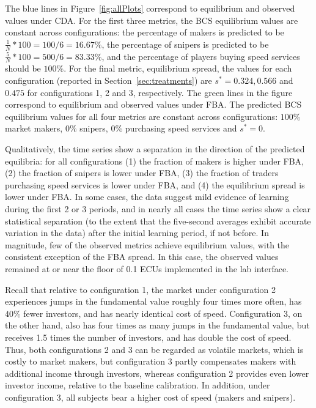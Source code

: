 \documentclass[12pt]{article}
\begin{document}
The blue lines in Figure~\ref{fig:allPlots} correspond to equilibrium and observed values under CDA. For the first three metrics, the BCS equilibrium values are constant across configurations: the percentage of makers is predicted to be $\frac{1}{N}*100 = 100/6 = 16.67\%$, the percentage of snipers is predicted to be $\frac{5}{N}*100 = 500/6 = 83.33\%$, and the percentage of players buying speed services should be $100\%$. For the final metric, equilibrium spread, the values for each configuration (reported in Section~\ref{sec:treatments}) are $s^*=0.324, 0.566$ and $0.475$ for configurations 1, 2 and 3, respectively. The green lines in the figure correspond to equilibrium and observed values under FBA. The predicted BCS equilibrium values for all four metrics are constant across configurations: $100\%$ market makers, $0\%$ snipers, $0\%$ purchasing speed services and $s^*=0$.

Qualitatively, the time series show a separation in the direction of the predicted equilibria: for all configurations (1) the fraction of makers is higher under FBA, (2) the fraction of snipers is lower under FBA, (3) the fraction of traders purchasing speed services is lower under FBA, and (4) the equilibrium spread is lower under FBA. In some cases, the data suggest mild evidence of learning during the first 2 or 3 periods, and in nearly all cases the time series show a clear statistical separation (to the extent that the five-second averages exhibit accurate variation in the data) after the initial learning period, if not before. In magnitude, few of the observed metrics achieve equilibrium values, with the consistent exception of the FBA spread. In this case, the observed values remained at or near the floor of 0.1 ECUs implemented in the lab interface.

Recall that relative to configuration 1, the market under configuration 2 experiences jumps in the fundamental value roughly four times more often, has $40\%$ fewer investors, and has nearly identical cost of speed. Configuration 3, on the other hand, also has four times as many jumps in the fundamental value, but receives 1.5 times the number of investors, and has double the cost of speed. Thus, both configurations 2 and 3 can be regarded as volatile markets, which is costly to market makers, but configuration 3 partly compensates makers with additional income through investors, whereas configuration 2 provides even lower investor income, relative to the baseline calibration. In addition, under configuration 3, all subjects bear a higher cost of speed (makers and snipers). 
\end{document}
